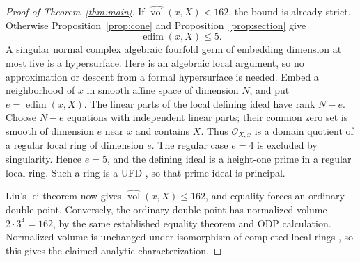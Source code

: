 \documentclass[11pt]{article}
\theoremstyle{definition}
\theoremstyle{remark}
\numberwithin{equation}{section}
\newcommand{\nvol}{\widehat{\operatorname{vol}}}
\newcommand{\edim}{\operatorname{edim}}
\newcommand{\cO}{\mathcal O}
\begin{document}
\begin{proof}[Proof of Theorem~\ref{thm:main}]
If \(\nvol(x,X)<162\), the bound is already strict. Otherwise Proposition~\ref{prop:cone} and Proposition~\ref{prop:section} give
\[
\edim(x,X)\le5.
\]
A singular normal complex algebraic fourfold germ of embedding dimension at most five is a hypersurface. Here is an algebraic local argument, so no approximation or descent from a formal hypersurface is needed. Embed a neighborhood of \(x\) in smooth affine space of dimension \(N\), and put \(e=\edim(x,X)\). The linear parts of the local defining ideal have rank \(N-e\). Choose \(N-e\) equations with independent linear parts; their common zero set is smooth of dimension \(e\) near \(x\) and contains \(X\). Thus \(\cO_{X,x}\) is a domain quotient of a regular local ring of dimension \(e\). The regular case \(e=4\) is excluded by singularity. Hence \(e=5\), and the defining ideal is a height-one prime in a regular local ring. Such a ring is a UFD \cite[Tag~0AG0]{Stacks}, so that prime ideal is principal.

Liu's lci theorem \cite[Theorem~2.12]{Liu} now gives
\(\nvol(x,X)\le162\), and equality forces an ordinary double point. Conversely, the ordinary double point has normalized volume \(2\cdot3^4=162\), by the same established equality theorem and ODP calculation. Normalized volume is unchanged under isomorphism of completed local rings \cite[Lemma~2.15]{Liu}, so this gives the claimed analytic characterization.
\end{proof}
\end{document}
